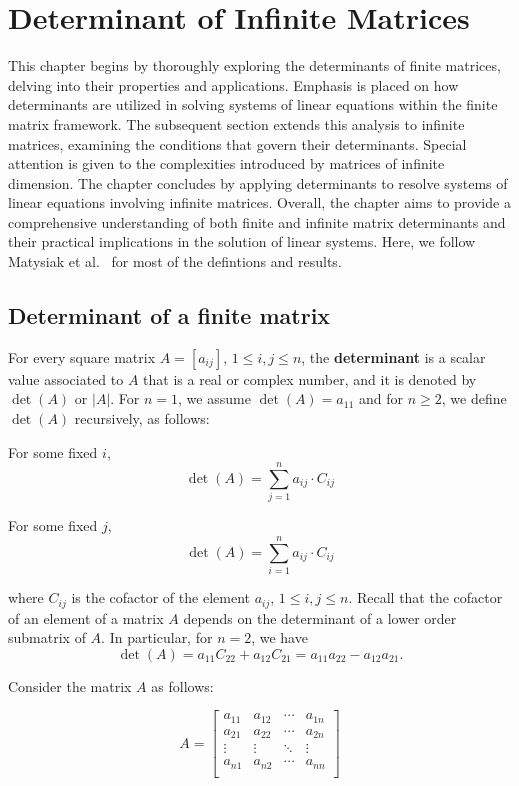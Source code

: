 \chapter{Determinant of Infinite Matrices}

This chapter begins by thoroughly exploring the determinants of finite matrices, delving into their properties and applications. Emphasis is placed on how determinants are utilized in solving systems of linear equations within the finite matrix framework. The subsequent section extends this analysis to infinite matrices, examining the conditions that govern their determinants. Special attention is given to the complexities introduced by matrices of infinite dimension. The chapter concludes by applying determinants to resolve systems of linear equations involving infinite matrices. Overall, the chapter aims to provide a comprehensive understanding of both finite and infinite matrix determinants and their practical implications in the solution of linear systems. Here, we follow Matysiak et al.~\cite{amgopaper} for most of the defintions and results.

\section{Determinant of a finite matrix} 

For every square matrix $A = [a_{ij}]$, $1\leq i,j\leq n$, the \textbf{determinant} is a scalar value associated to $A$ that is a real or complex number, and it is denoted by $\det(A)$ or $|A|$. For $n = 1$, we assume $\det(A) = a_{11}$ and for $n\geq 2$, we define $\det(A)$ recursively, as follows:

For some fixed $i$,
\[
  \det(A) = \sum_{j=1}^{n} a_{ij} \cdot C_{ij}
\]

For some fixed $j$,
\[
  \det(A) = \sum_{i=1}^{n} a_{ij} \cdot C_{ij}
\]

where $C_{ij}$ is the cofactor of the element $a_{ij}$, $1\leq i,j\leq n$. Recall that the cofactor of an element of a matrix $A$ depends on the determinant of a lower order submatrix of $A$. In particular, for $n = 2$, we have 
\[
\det(A) = a_{11}C_{22}+a_{12}C_{21} = a_{11}a_{22}-a_{12}a_{21}.
\]


Consider the matrix $A$ as follows:

\[
A = \begin{bmatrix}
    a_{11} & a_{12} & \cdots & a_{1n} \\
    a_{21} & a_{22} & \cdots & a_{2n} \\
    \vdots & \vdots & \ddots & \vdots \\
    a_{n1} & a_{n2} & \cdots & a_{nn} \\
\end{bmatrix}
\]

